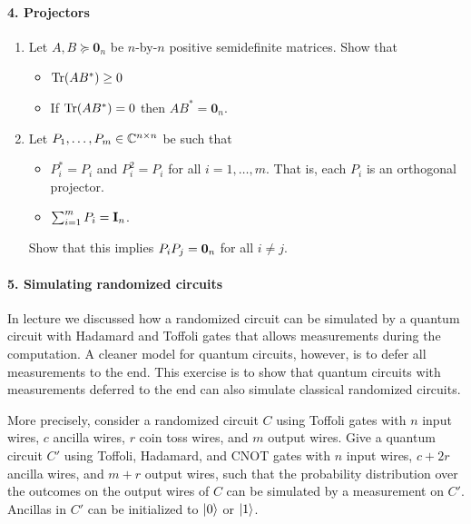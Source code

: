 \paragraph*{4. Projectors} 
\begin{enumerate}
\item Let $A,B \succeq \mathbf{0}_n$ be $n$-by-$n$ positive semidefinite matrices.  Show that 
\begin{itemize}
  \item $\mathrm{Tr}(AB^*) \ge 0$  
  \item If $\mathrm{Tr}(AB^*) = 0$ then $AB^* = \mathbf{0}_n$.
\end{itemize}
\item Let $P_1, \ldots, P_m \in \mathbb{C}^{n \times n}$ be such that 
\begin{itemize}
  \item $P_i^* = P_i$ and $P_i^2 = P_i$ for all $i =1, \ldots, m$.  That is, each $P_i$ is an orthogonal projector.
  \item $\sum_{i=1}^m P_i = \mathbf{I}_n$.
\end{itemize}
Show that this implies $P_i P_j = \mathbf{0}_n$ for all $i \ne j$.  
\end{enumerate}

\paragraph*{5. Simulating randomized circuits}
In lecture we discussed how a randomized circuit can be simulated by a quantum circuit with Hadamard and Toffoli gates 
that allows measurements during the computation.  A cleaner model for quantum circuits, however, is to defer all measurements to the end.  
This exercise is to show that quantum circuits with measurements deferred to the end can also simulate classical randomized circuits.

More precisely, consider a randomized circuit $C$ using Toffoli gates with $n$ input wires, $c$ ancilla wires, $r$ coin toss wires, and $m$ output wires.  
Give a quantum circuit $C'$ using Toffoli, Hadamard, and CNOT gates with $n$ input wires, $c+2r$ ancilla wires, and $m+r$ output wires, such that the probability
distribution over the outcomes on the output wires of $C$ can be simulated by a measurement on $C'$.  Ancillas in $C'$ can be initialized to $|0\rangle$ or $|1\rangle$.  


